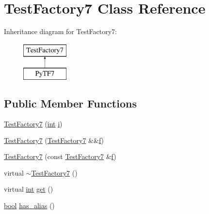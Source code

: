 \hypertarget{class_test_factory7}{}\section{Test\+Factory7 Class Reference}
\label{class_test_factory7}
Inheritance diagram for Test\+Factory7\+:\begin{figure}[H]
\begin{center}
\leavevmode
\includegraphics[height=2.000000cm]{class_test_factory7}
\end{center}
\end{figure}
\subsection*{Public Member Functions}
\begin{DoxyCompactItemize}
\item 
\mbox{\hyperlink{class_test_factory7_a024bbedeb203321968aa939a4af7591c}{Test\+Factory7}} (\mbox{\hyperlink{warnings_8h_a74f207b5aa4ba51c3a2ad59b219a423b}{int}} \mbox{\hyperlink{abstract_8h_a13235ab5ddf5c2ccd5ca35ab01d91328}{i}})
\item 
\mbox{\hyperlink{class_test_factory7_a72005ae65f0bb2988d565f30f9782802}{Test\+Factory7}} (\mbox{\hyperlink{class_test_factory7}{Test\+Factory7}} \&\&\mbox{\hyperlink{_s_d_l__opengl__glext_8h_a691492ec0bd6383f91200e49f6ae40ed}{f}})
\item 
\mbox{\hyperlink{class_test_factory7_aae0255660924950a75302993f1315252}{Test\+Factory7}} (const \mbox{\hyperlink{class_test_factory7}{Test\+Factory7}} \&\mbox{\hyperlink{_s_d_l__opengl__glext_8h_a691492ec0bd6383f91200e49f6ae40ed}{f}})
\item 
virtual \mbox{\hyperlink{class_test_factory7_aea1114c5be253e68d04ebf7dee294aa5}{$\sim$\+Test\+Factory7}} ()
\item 
virtual \mbox{\hyperlink{warnings_8h_a74f207b5aa4ba51c3a2ad59b219a423b}{int}} \mbox{\hyperlink{class_test_factory7_a6ffd89e74c14c47aecd85ec468f5bfbb}{get}} ()
\item 
\mbox{\hyperlink{asdl_8h_af6a258d8f3ee5206d682d799316314b1}{bool}} \mbox{\hyperlink{class_test_factory7_ab388702c5c8eb5ac9adccd24349119fc}{has\+\_\+alias}} ()
\end{DoxyCompactItemize}
